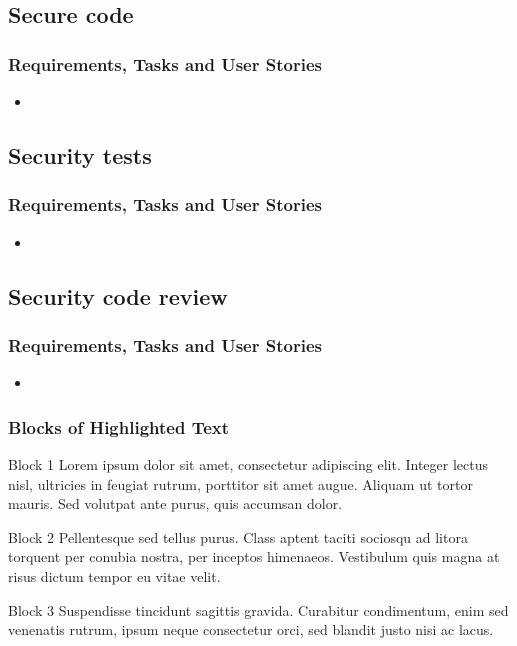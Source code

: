 \documentclass{beamer}
\begin{document}
\subsection{Secure code}
\begin{frame}
\frametitle{Requirements, Tasks and User Stories}
\begin{itemize}
\item
\end{itemize}
\end{frame}

\subsection{Security tests}
\begin{frame}
\frametitle{Requirements, Tasks and User Stories}
\begin{itemize}
\item
\end{itemize}
\end{frame}

\subsection{Security code review}
\begin{frame}
\frametitle{Requirements, Tasks and User Stories}
\begin{itemize}
\item
\end{itemize}
\end{frame}

\begin{frame}
\frametitle{Blocks of Highlighted Text}
\begin{block}{Block 1}
Lorem ipsum dolor sit amet, consectetur adipiscing elit. Integer lectus nisl, ultricies in feugiat rutrum, porttitor sit amet augue. Aliquam ut tortor mauris. Sed volutpat ante purus, quis accumsan dolor.
\end{block}

\begin{block}{Block 2}
Pellentesque sed tellus purus. Class aptent taciti sociosqu ad litora torquent per conubia nostra, per inceptos himenaeos. Vestibulum quis magna at risus dictum tempor eu vitae velit.
\end{block}

\begin{block}{Block 3}
Suspendisse tincidunt sagittis gravida. Curabitur condimentum, enim sed venenatis rutrum, ipsum neque consectetur orci, sed blandit justo nisi ac lacus.
\end{block}
\end{frame}
\end{document}
